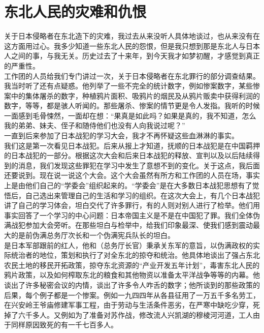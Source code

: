 \fancyhead[RO]{} %
\fancyhead[LE]{} %
\chapter*{东北人民的灾难和仇恨}
\thispagestyle{empty}
关于日本侵略者在东北造下的灾难，我过去从来没听人具体地谈过，也从来没有在这方面用过心。我多少知道一些东北人民的怨恨，但是我只想到那是东北人与日本人之间的事，与我无关。历史过去了十来年，到今天我才如梦初醒，才感觉到真正的严重性。\\

工作团的人员给我们专门讲过一次，关于日本侵略者在东北罪行的部分调查结果。我当时听了还有点疑惑。他列举了一些不完全的统计数字，例如惨案数字，某些惨案中的集体屠杀的数字，种植鸦片面积、吸鸦片的烟民及从鸦片贩卖中获得利润的数字，等等，都是骇人听闻的。那些屠杀、惨案的情节更是令人发指。我听的时候一面感到毛骨悚然，一面却在想：“果真是如此吗？如果是真的，我不知道，怎么我的弟弟、妹夫、侄子和随侍他们也没有人向我说过呢？”\\

一直到后来参加了日本战犯的学习大会，我才不再怀疑这些血淋淋的事实。\\

我们这是第一次看见日本战犯。后来从报上才知道，抚顺的日本战犯是在中国羁押的日本战犯的一部分。根据这次大会和后来日本战犯的释放、宣判以及以后陆续得到的消息，我们发现这些罪犯在学习中发生了意想不到的变化。关于这点，我后面还要说到。现在说一说这个大会。这个大会虽然有所方和工作团的人员在场，事实上是由他们自己的“学委会”组织起来的。“学委会”是在大多数日本战犯思想有了觉悟后，自己选出来管理自己的生活和学习的组织。在这次大会上，有几个日本战犯讲了自己的学习体会，坦白交代了许多罪行，有的人则对别人进行了检举。他们用事实回答了一个学习的中心问题：日本帝国主义是不是在中国犯了罪。我们全体伪满战犯参加大会旁听。在那些坦白与检举中，给我们印象最深、使我们感到震动最大的是前伪满总务厅次长和一个伪满宪兵队长的坦白。\\

是日本军部跟前的红人，他和（总务厅长官）秉承关东军的意旨，以伪满政权的实际统治者的地位，策划和执行了对全东北的掠夺和统治。他具体地谈出了强占东北农民土地的移民开拓政策，掠夺东北资源的“产业开发五年计划”，毒害东北人民的鸦片政策，以及如何榨取东北的粮食和其他物资以准备太平洋战争等等的内幕。他谈出了许多秘密会议的内情，谈出了许多令人咋舌的数字；他所谈到的那些政策的后果，每个例子都是一个惨案。例如一九四四年从各县征用了一万五千多名劳工，在兴安岭王爷庙修建军事工程，由于劳动与生活条件恶劣，在严寒中缺吃少穿，死掉了六千多人。又例如为了准备对苏作战，修改流人兴凯湖的穆棱河河道，工人由于同样原因致死的有一千七百多人。\\

